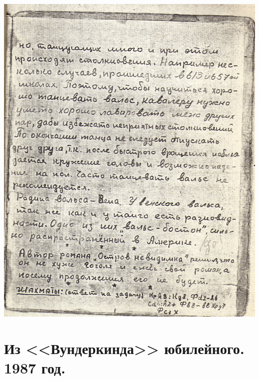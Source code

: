 \noindent
\includegraphics[width=\textwidth]{inc/Vynd/Vynd013}

\section*{Из <<Вундеркинда>> юбилейного. 1987 год.}

